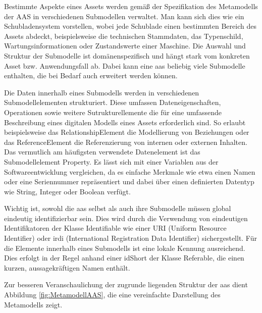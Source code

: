 Bestimmte Aspekte eines Assets werden gemäß der Spezifikation des Metamodells der AAS \cite{SpezifikationPart1} in verschiedenen Submodellen verwaltet.
Man kann sich dies wie ein Schubladensystem vorstellen, wobei jede Schublade einen bestimmten Bereich des Assets abdeckt, beispielsweise die technischen Stammdaten, das Typenschild, Wartungsinformationen oder Zustandswerte einer Maschine.
Die Auswahl und Struktur der Submodelle ist domänenspezifisch und hängt stark vom konkreten Asset bzw. Anwendungsfall ab. 
Dabei kann eine \acs{aas} beliebig viele Submodelle enthalten, die bei Bedarf auch erweitert werden können. 

Die Daten innerhalb eines Submodells werden in verschiedenen Submodellelementen strukturiert.
Diese umfassen Dateneigenschaften, Operationen sowie weitere Sutrukturellemente die für eine umfassende Beschreibung eines digitalen Modells eines Assets erforderlich sind.
So erlaubt beispielsweise das RelationshipElement die Modellierung von Beziehungen oder das ReferenceElement die Referenzierung von internen oder externen Inhalten.
Das vermutlich am häufigsten verwendete Datenelement ist das Submodellelement Property.
Es lässt sich mit einer Variablen aus der Softwareentwicklung vergleichen, da es einfache Merkmale wie etwa einen Namen oder eine Seriennummer repräsentiert und dabei über einen definierten Datentyp wie String, Integer oder Boolean verfügt.

Wichtig ist, sowohl die \acs{aas} selbst als auch ihre Submodelle müssen global eindeutig identifizierbar sein.
Dies wird durch die Verwendung von eindeutigen Identifikatoren der Klasse Identifiable wie einer URI (Uniform Resource Identifier) oder \acs{irdi} (International Registration Data Identifier) sichergestellt.
Für die Elemente innerhalb eines Submodells ist eine lokale Kennung ausreichend. 
Dies erfolgt in der Regel anhand einer idShort der Klasse Referable, die einen kurzen, aussagekräftigen Namen enthält.

Zur besseren Veranschaulichung der zugrunde liegenden Struktur der \acs{aas} dient Abbildung \ref{fig:MetamodellAAS}, die eine vereinfachte Darstellung des Metamodells zeigt.


